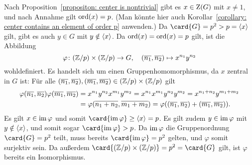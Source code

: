 Nach Proposition~\ref{propositon: center is nontrivial} gibt es $x \in \operatorname{Z}(G)$ mit $x \neq 1$, und nach Annahme gilt $\operatorname{ord}(x) = p$.
(Man könnte hier auch Korollar~\ref{corollary: center contains an element of order p} anwenden.)
Da $\card{G} = p^2 > p = \generated{x}$ gilt, gibt es auch $y \in G$ mit $y \notin \langle x\rangle$.
Da $\operatorname{ord}(x) = \operatorname{ord}(x) = p$ gilt, ist die Abbildung
\[
          \varphi
  \colon  (\mathbb{Z}/p) \times (\mathbb{Z}/p)
  \to     G,
  \quad   (\overline{n_1}, \overline{n_2})
  \mapsto x^{n_1} y^{n_2}
\]
wohldefiniert.
Es handelt sich um einen Gruppenhomomorphismus, da $x$ zentral in $G$ ist:
Für alle $(\overline{n_1}, \overline{n_2}), (\overline{m_1}, \overline{m_2}) \in (\mathbb{Z}/p) \times (\mathbb{Z}/p)$ gilt
\begin{align*}
      \varphi(\overline{n_1}, \overline{n_2}) \varphi(\overline{m_1}, \overline{m_2})
  &=  x^{n_1} y^{n_2} x^{m_1} y^{m_2}
   =  x^{n_1} x^{m_1} y^{n_2} y^{m_2}
   =  x^{n_1 + n_2} y^{m_1 + m_2}
  \\
  &=  \varphi(\overline{n_1 + n_2}, \overline{m_1 + m_2})
   =  \varphi( (\overline{n_1}, \overline{n_2}) + (\overline{m_1}, \overline{m_2}) ).
\end{align*}
Es gilt $x \in \operatorname{im} \varphi$ und somit $\card{\im \varphi} \geq \generated{x} = p$.
Es gilt zudem $y \in \operatorname{im} \varphi$ mit $y \notin \langle x\rangle$, und somit sogar $\card{\im \varphi} > p$.
Da $\operatorname{im} \varphi$ die Gruppenordnung $\card{G} = p^2$ teilt, muss bereits $\card{\im \varphi} = p^2$ gelten, und $\varphi$ somit surjektiv sein.
Da außerdem $\card{(\Integer/p) \times (\Integer/p)} = p^2 = \card{G}$ gilt, ist $\varphi$ bereits ein Isomorphismus.

